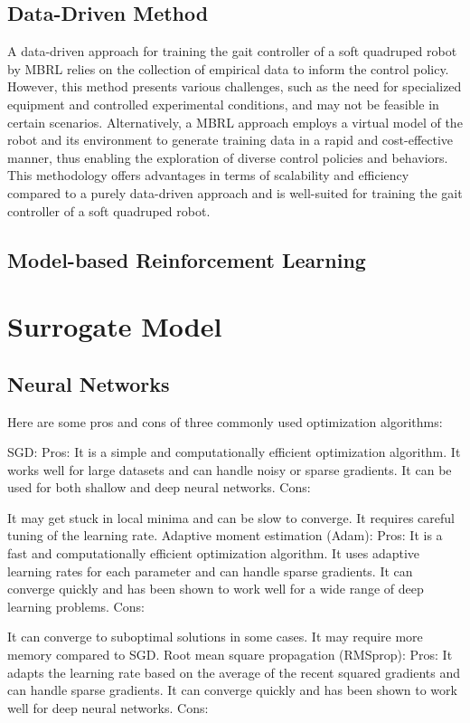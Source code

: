 \subsection{Data-Driven Method}
A data-driven approach for training the gait controller of a soft quadruped robot by \ac{MBRL} relies on the collection of empirical data to inform the control policy. However, this method presents various challenges, such as the need for specialized equipment and controlled experimental conditions, and may not be feasible in certain scenarios. Alternatively, a \ac{MBRL} approach employs a virtual model of the robot and its environment to generate training data in a rapid and cost-effective manner, thus enabling the exploration of diverse control policies and behaviors. This methodology offers advantages in terms of scalability and efficiency compared to a purely data-driven approach and is well-suited for training the gait controller of a soft quadruped robot. 

\subsection{Model-based Reinforcement Learning}

\section{Surrogate Model}

\subsection{Neural Networks}
Here are some pros and cons of three commonly used optimization algorithms:

\ac{SGD}:
Pros:
It is a simple and computationally efficient optimization algorithm.
It works well for large datasets and can handle noisy or sparse gradients.
It can be used for both shallow and deep neural networks.
Cons:

It may get stuck in local minima and can be slow to converge.
It requires careful tuning of the learning rate.
Adaptive moment estimation (Adam):
Pros:
It is a fast and computationally efficient optimization algorithm.
It uses adaptive learning rates for each parameter and can handle sparse gradients.
It can converge quickly and has been shown to work well for a wide range of deep learning problems.
Cons:

It can converge to suboptimal solutions in some cases.
It may require more memory compared to \ac{SGD}.
Root mean square propagation (RMSprop):
Pros:
It adapts the learning rate based on the average of the recent squared gradients and can handle sparse gradients.
It can converge quickly and has been shown to work well for deep neural networks.
Cons:

